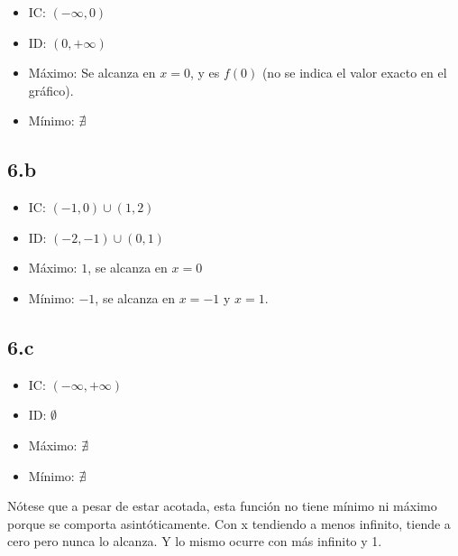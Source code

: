 \documentclass{article}
\begin{document}
\begin{itemize}

\item IC: $(-\infty, 0)$

\item ID: $(0, +\infty)$

\item Máximo: Se alcanza en $x = 0$, y es $f(0)$ (no se indica el valor exacto en el gráfico).

\item Mínimo: $\nexists$

\end{itemize}

\subsection*{6.b}
\label{subsec:6.b}

\begin{itemize}

\item IC: $(-1, 0) \cup (1, 2)$

\item ID: $(-2, -1) \cup (0, 1)$

\item Máximo: $1$, se alcanza en $x = 0$

\item Mínimo: $-1$, se alcanza en $x = -1$ y $x = 1$.

\end{itemize}

\subsection*{6.c}
\label{subsec:6.c}

\begin{itemize}

\item IC: $(-\infty, +\infty)$

\item ID: $\emptyset$

\item Máximo: $\nexists$

\item Mínimo: $\nexists$

\end{itemize}

Nótese que a pesar de estar acotada, esta función no tiene mínimo ni máximo porque se comporta asintóticamente. Con x tendiendo a menos infinito, tiende a cero pero nunca lo alcanza. Y lo mismo ocurre con más infinito y 1.
\end{document}
